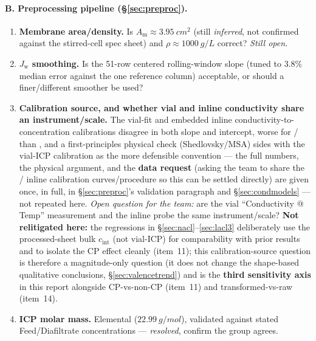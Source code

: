 \documentclass[11pt]{article}
\newcommand{\Jw}{J_{\mathrm{w}}}
\newcommand{\cint}{c_{\mathrm{int}}}
\begin{document}
\paragraph{B. Preprocessing pipeline (\S\ref{sec:preproc}).}
\begin{enumerate}[itemsep=3pt,leftmargin=2.2em,start=7]
  \item \textbf{Membrane area/density.} Is $A_{\mathrm m}\approx\SI{3.95}{cm^2}$
        (still \emph{inferred}, not confirmed against the stirred-cell spec
        sheet) and $\rho\approx\SI{1000}{g/L}$ correct? \emph{Still open.}
  \item \textbf{$\Jw$ smoothing.} Is the 51-row centered rolling-window slope
        (tuned to $3.8\%$ median error against the one reference column)
        acceptable, or should a finer/different smoother be used?
  \item \textbf{Calibration source, and whether vial and inline conductivity
        share an instrument/scale.} The vial-fit and embedded inline
        conductivity-to-concentration calibrations disagree in both slope and
        intercept, worse for / than , and a
        first-principles physical check (Shedlovsky/MSA) sides with the
        vial-ICP calibration as the more defensible convention --- the full
        numbers, the physical argument, and the \textbf{data request} (asking
        the team to share the / inline calibration
        curves/procedure so this can be settled directly) are given once, in
        full, in \S\ref{sec:preproc}'s validation paragraph and
        \S\ref{sec:condmodels} --- not repeated here. \emph{Open question for
        the team:} are the vial ``Conductivity @ Temp'' measurement and the
        inline probe the same instrument/scale? \textbf{Not relitigated
        here:} the regressions in \S\ref{sec:nacl}--\ref{sec:lacl3}
        deliberately use the processed-sheet bulk $\cint$ (not vial-ICP) for
        comparability with prior results and to isolate the CP effect cleanly
        (item~11); this calibration-source question is therefore a
        magnitude-only question (it does not change the shape-based
        qualitative conclusions, \S\ref{sec:valencetrend}) and is the
        \textbf{third sensitivity axis} in this report alongside CP-vs-non-CP
        (item~11) and transformed-vs-raw (item~14).
  \item \textbf{ICP molar mass.} Elemental  ($\SI{22.99}{g/mol}$),
        validated against stated Feed/Diafiltrate concentrations ---
        \emph{resolved}, confirm the group agrees.

\end{enumerate}
\end{document}
